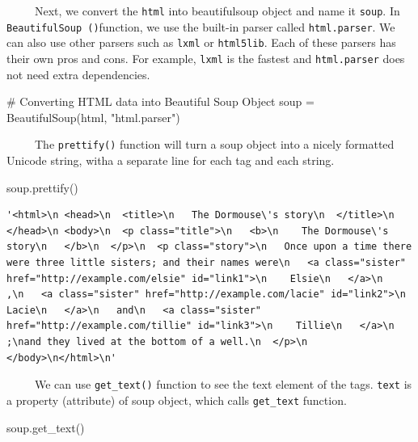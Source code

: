 \documentclass[
  letterpaper,
  DIV=11,
  numbers=noendperiod]{scrreprt}
\newenvironment{Shaded}{\begin{snugshade}}{\end{snugshade}}
\newcommand{\CommentTok}[1]{\textcolor[rgb]{0.37,0.37,0.37}{#1}}
\newcommand{\NormalTok}[1]{\textcolor[rgb]{0.00,0.23,0.31}{#1}}
\newcommand{\OperatorTok}[1]{\textcolor[rgb]{0.37,0.37,0.37}{#1}}
\newcommand{\StringTok}[1]{\textcolor[rgb]{0.13,0.47,0.30}{#1}}
\begin{document}
~~~~~Next, we convert the \texttt{html} into beautifulsoup object and
name it \texttt{soup}. In \texttt{BeautifulSoup\ ()}function, we use the
built-in parser called \texttt{html.parser}. We can also use other
parsers such as \texttt{lxml} or \texttt{html5lib}. Each of these
parsers has their own pros and cons. For example, \texttt{lxml} is the
fastest and \texttt{html.parser} does not need extra dependencies.

\begin{Shaded}
\begin{Highlighting}[]
\CommentTok{\# Converting HTML data into Beautiful Soup Object }
\NormalTok{soup }\OperatorTok{=}\NormalTok{ BeautifulSoup(html, }\StringTok{"html.parser"}\NormalTok{)}
\end{Highlighting}
\end{Shaded}

~~~~~The \texttt{prettify()} function will turn a soup object into a
nicely formatted Unicode string, witha a separate line for each tag and
each string.

\begin{Shaded}
\begin{Highlighting}[]
\NormalTok{soup.prettify()}
\end{Highlighting}
\end{Shaded}

\begin{verbatim}
'<html>\n <head>\n  <title>\n   The Dormouse\'s story\n  </title>\n </head>\n <body>\n  <p class="title">\n   <b>\n    The Dormouse\'s story\n   </b>\n  </p>\n  <p class="story">\n   Once upon a time there were three little sisters; and their names were\n   <a class="sister" href="http://example.com/elsie" id="link1">\n    Elsie\n   </a>\n   ,\n   <a class="sister" href="http://example.com/lacie" id="link2">\n    Lacie\n   </a>\n   and\n   <a class="sister" href="http://example.com/tillie" id="link3">\n    Tillie\n   </a>\n   ;\nand they lived at the bottom of a well.\n  </p>\n </body>\n</html>\n'
\end{verbatim}

~~~~~We can use \texttt{get\_text()} function to see the text element of
the tags. \texttt{text} is a property (attribute) of soup object, which
calls \texttt{get\_text} function.

\begin{Shaded}
\begin{Highlighting}[]
\NormalTok{soup.get\_text()}
\end{Highlighting}
\end{Shaded}
\end{document}
